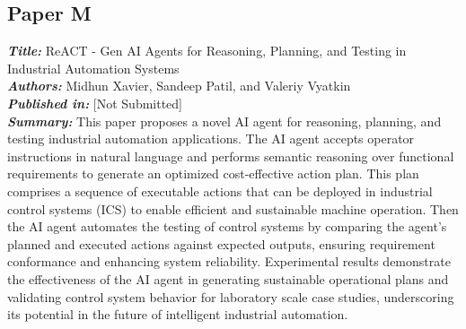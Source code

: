 \subsection{Paper M}
\textbf{\textit{Title:}} ReACT - Gen AI Agents for Reasoning, Planning, and Testing in Industrial Automation Systems\\
\textbf{\textit{Authors:}} Midhun Xavier, Sandeep Patil, and Valeriy Vyatkin\\
\textbf{\textit{Published in:}} [Not Submitted]\\
\textbf{\textit{Summary:}} This paper proposes a novel AI agent for reasoning, planning, and testing industrial automation applications. The AI agent accepts operator instructions in natural language and performs semantic reasoning over functional requirements to generate an optimized cost-effective action plan. This plan comprises a sequence of executable actions that can be deployed in industrial control systems (ICS) to enable efficient and sustainable machine operation. Then the AI agent automates the testing of control systems by comparing the agent's planned and executed actions against expected outputs, ensuring requirement conformance and enhancing system reliability. Experimental results demonstrate the effectiveness of the AI agent in generating sustainable operational plans and validating control system behavior for laboratory scale case studies, underscoring its potential in the future of intelligent industrial automation.\\
